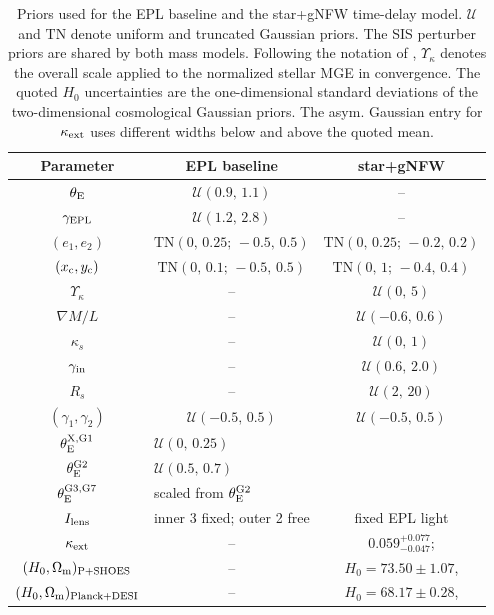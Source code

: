 \documentclass[fleqn,usenatbib]{mnras}
\begin{document}
\begin{table}
\centering
\small
\renewcommand{\arraystretch}{1.0}
\setlength{\tabcolsep}{4pt}
\begin{tabular}{ccc}
\hline
\textbf{Parameter} &
\textbf{EPL baseline} &
\textbf{star+gNFW} \\
\hline
$\theta_{\rm E}$ &
$\mathcal{U}(0.9,\,1.1)$ &
-- \\
$\gamma_{\rm EPL}$ &
$\mathcal{U}(1.2,\,2.8)$ &
-- \\
$(e_1,e_2)$ &
$\mathrm{TN}(0,\,0.25;\,-0.5,\,0.5)$ &
$\mathrm{TN}(0,\,0.25;\,-0.2,\,0.2)$ \\
$(x_{\rm c},y_{\rm c})$ &
$\mathrm{TN}(0,\,0.1;\,-0.5,\,0.5)$ &
$\mathrm{TN}(0,\,1;\,-0.4,\,0.4)$ \\
$\Upsilon_{\kappa}$ &
-- &
$\mathcal{U}(0,\,5)$ \\
$\nabla M/L$ &
-- &
$\mathcal{U}(-0.6,\,0.6)$ \\
$\kappa_s$ &
-- &
$\mathcal{U}(0,\,1)$ \\
$\gamma_{\rm in}$ &
-- &
$\mathcal{U}(0.6,\,2.0)$ \\
$R_s$ &
-- &
$\mathcal{U}(2,\,20)$ \\
$(\gamma_1,\gamma_2)$ &
$\mathcal{U}(-0.5,\,0.5)$ &
$\mathcal{U}(-0.5,\,0.5)$ \\
$\theta_{\rm E}^{\rm X,G1}$ &
\multicolumn{2}{l}{$\mathcal{U}(0,\,0.25)$} \\
$\theta_{\rm E}^{\rm G2}$ &
\multicolumn{2}{l}{$\mathcal{U}(0.5,\,0.7)$} \\
$\theta_{\rm E}^{\rm G3,G7}$ &
\multicolumn{2}{l}{scaled from \(\theta_{\rm E}^{\rm G2}\)} \\
$I_{\rm lens}$ &
inner 3 fixed; outer 2 free &
fixed EPL light \\
$\kappa_{\rm ext}$ &
-- &
\(0.059^{+0.077}_{-0.047}\);\\
$(H_0,\Omega_{\rm m})_{\rm P+SHOES}$ &
-- &
\(H_0=73.50\pm1.07\),\\
$(H_0,\Omega_{\rm m})_{\rm Planck+DESI}$ &
-- &
\(H_0=68.17\pm0.28\),\\
\hline
\end{tabular}
\caption{Priors used for the EPL baseline and the star+gNFW time-delay model. \(\mathcal{U}\) and \(\mathrm{TN}\) denote uniform and truncated Gaussian priors. The SIS perturber priors are shared by both mass models. Following the notation of \citet{Tian2026}, \(\Upsilon_{\kappa}\) denotes the overall scale applied to the normalized stellar MGE in convergence. The quoted \(H_0\) uncertainties are the one-dimensional standard deviations of the two-dimensional cosmological Gaussian priors. The asym. Gaussian entry for \(\kappa_{\rm ext}\) uses different widths below and above the quoted mean.}
\label{tab:prior_all}
\end{table}
\end{document}
